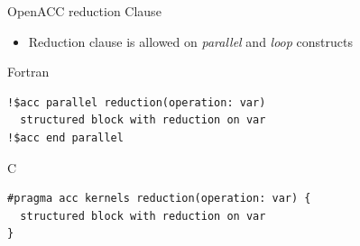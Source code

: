\documentclass[10pt,t]{beamer}
\begin{document}
\begin{frame}{OpenACC reduction Clause}
  \begin{itemize}
    \item Reduction clause is allowed on \textit{parallel} and \textit{loop} constructs
  \end{itemize}
  \begin{exampleblock}{Fortran}
    \begin{lstlisting}[basicstyle=\small\ttfamily,language=OmpFortran]
!$acc parallel reduction(operation: var)
  structured block with reduction on var
!$acc end parallel
    \end{lstlisting}
  \end{exampleblock}
  \begin{exampleblock}{C}
    \begin{lstlisting}[basicstyle=\small\ttfamily,language=OmpC]
#pragma acc kernels reduction(operation: var) {
  structured block with reduction on var
}
    \end{lstlisting}
  \end{exampleblock}

\end{frame}
\end{document}
